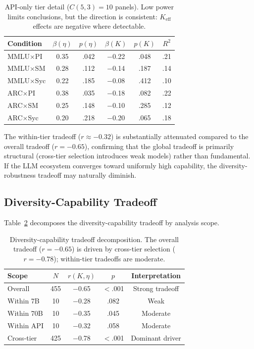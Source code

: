 \documentclass[11pt,a4paper]{article}
\begin{document}
\begin{table}[t]
\centering
\small
\caption{API-only tier detail ($C(5,3) = 10$ panels). Low power limits conclusions, but the direction is consistent: $K_{\text{eff}}$ effects are negative where detectable.}
\label{tab:api-detail}
\begin{tabular}{@{}lccccc@{}}
\toprule
Condition & $\beta(\eta)$ & $p(\eta)$ & $\beta(K)$ & $p(K)$ & $R^2$ \\
\midrule
MMLU$\times$PI  & 0.35 & .042 & $-$0.22 & .048 & .21 \\
MMLU$\times$SM  & 0.28 & .112 & $-$0.14 & .187 & .14 \\
MMLU$\times$Syc & 0.22 & .185 & $-$0.08 & .412 & .10 \\
ARC$\times$PI   & 0.38 & .035 & $-$0.18 & .082 & .22 \\
ARC$\times$SM   & 0.25 & .148 & $-$0.10 & .285 & .12 \\
ARC$\times$Syc  & 0.20 & .218 & $-$0.20 & .065 & .18 \\
\bottomrule
\end{tabular}
\vspace{-2mm}
\end{table}

The within-tier tradeoff ($r \approx -0.32$) is substantially attenuated compared to the overall tradeoff ($r = -0.65$), confirming that the global tradeoff is primarily structural (cross-tier selection introduces weak models) rather than fundamental. If the LLM ecosystem converges toward uniformly high capability, the diversity-robustness tradeoff may naturally diminish.

\subsection{Diversity-Capability Tradeoff}

Table~\ref{tab:tradeoff} decomposes the diversity-capability tradeoff by analysis scope.

\begin{table}[t]
\centering
\small
\caption{Diversity-capability tradeoff decomposition. The overall tradeoff ($r = -0.65$) is driven by cross-tier selection ($r = -0.78$); within-tier tradeoffs are moderate.}
\label{tab:tradeoff}
\begin{tabular}{@{}lcccc@{}}
\toprule
Scope & $N$ & $r(K, \eta)$ & $p$ & Interpretation \\
\midrule
Overall       & 455 & $-$0.65 & {$<$.001} & Strong tradeoff \\
Within 7B     & 10  & $-$0.28 & .082 & Weak \\
Within 70B    & 10  & $-$0.35 & .045 & Moderate \\
Within API    & 10  & $-$0.32 & .058 & Moderate \\
Cross-tier    & 425 & $-$0.78 & {$<$.001} & Dominant driver \\
\bottomrule
\end{tabular}
\vspace{-2mm}
\end{table}
\end{document}
